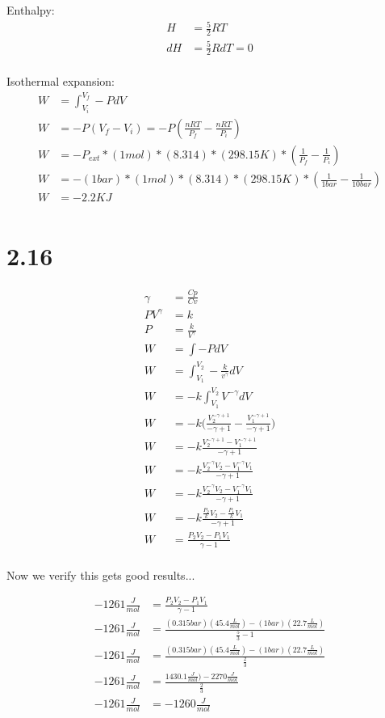\documentclass[10pt]{article} %
\begin{document}
Enthalpy:
\begin{align}
  H &= \frac{5}{2}RT\\
  dH &= \frac{5}{2}RdT = 0\\
\end{align}

Isothermal expansion:
\begin{align}
  W &= \int_{V_i}^{V_f} -PdV\\
  W &= -P(V_f - V_i) = -P(\frac{nRT}{P_f} - \frac{nRT}{P_i})\\
  W &= -P_{ext}*(1 mol)*(8.314)*(298.15K) * (\frac{1}{P_f} - \frac{1}{P_i})\\
  W &= -(1 bar)*(1 mol)*(8.314)*(298.15K) * (\frac{1}{1 bar} - \frac{1}{10 bar})\\
  W &= -2.2KJ\\
\end{align}

\section{2.16}

\begin{align}
  \gamma &= \frac{Cp}{Cv}\\
  PV^{\gamma} &= k\\
  P &= \frac{k}{V^{\gamma}}\\
  W &= \int -PdV\\
  W &= \int_{V_1}^{V_2} -\frac{k}{v^\gamma}dV\\
  W &= -k\int_{V_1}^{V_2} V^{-\gamma}dV\\  
  W &= -k\Big( \frac{V_2^{-\gamma+1}}{-\gamma + 1} - \frac{V_1^{-\gamma+1}}{-\gamma + 1} \Big) \\
  W &= -k\frac{V_2^{-\gamma+1} - V_1^{-\gamma+1}}{-\gamma + 1}\\
  W &= -k\frac{V_2^{-\gamma}V_2 - V_1^{-\gamma}V_1}{-\gamma + 1}\\
  W &= -k\frac{V_2^{-\gamma}V_2 - V_1^{-\gamma}V_1}{-\gamma + 1}\\
  W &= -k\frac{\frac{P_2}{k}V_2 - \frac{P_1}{k}V_1}{-\gamma + 1}\\    
  W &= \frac{P_2V_2 - P_1V_1}{\gamma - 1}\\
\end{align}

Now we verify this gets good results...

\begin{align}
  -1261 \frac{J}{mol} &= \frac{P_2V_2 - P_1V_1}{\gamma - 1}\\
  -1261 \frac{J}{mol} &= \frac{(0.315 bar)(45.4 \frac{L}{mol}) - (1 bar)(22.7 \frac{L}{mol})}{\frac{5}{3} - 1}\\
  -1261 \frac{J}{mol} &= \frac{(0.315 bar)(45.4 \frac{L}{mol}) - (1 bar)(22.7 \frac{L}{mol})}{\frac{2}{3}}\\
  -1261 \frac{J}{mol} &= \frac{ 1430.1 \frac{J}{mol}) - 2270 \frac{J}{mol}}{\frac{2}{3}}\\
  -1261 \frac{J}{mol} &= -1260 \frac{J}{mol}
\end{align}
\end{document}
